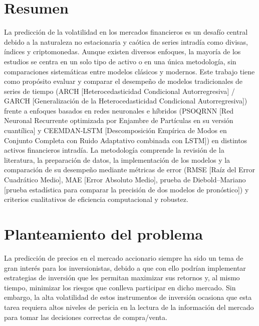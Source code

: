\documentclass[12pt]{paper}
\begin{document}
\section[Resumen]{Resumen}

La predicción de la volatilidad en los mercados financieros es un desafío central debido a la naturaleza no estacionaria y caótica de series intradía como divisas, índices y criptomonedas. Aunque existen diversos enfoques, la mayoría de los estudios se centra en un solo tipo de activo o en una única metodología, sin comparaciones sistemáticas entre modelos clásicos y modernos. Este trabajo tiene como propósito evaluar y comparar el desempeño de modelos tradicionales de series de tiempo (ARCH [Heterocedasticidad Condicional Autorregresiva] / GARCH [Generalización de la Heterocedasticidad Condicional Autorregresiva]) frente a enfoques basados en redes neuronales e híbridos (PSOQRNN [Red Neuronal Recurrente optimizada por Enjambre de Partículas en su versión cuantílica] y CEEMDAN-LSTM [Descomposición Empírica de Modos en Conjunto Completa con Ruido Adaptativo combinada con LSTM]) en distintos activos financieros intradía. La metodología comprende la revisión de la literatura, la preparación de datos, la implementación de los modelos y la comparación de su desempeño mediante métricas de error (RMSE [Raíz del Error Cuadrático Medio], MAE [Error Absoluto Medio], prueba de Diebold–Mariano [prueba estadística para comparar la precisión de dos modelos de pronóstico]) y criterios cualitativos de eficiencia computacional y robustez.

\section[Planteamiento del problema]{Planteamiento del problema}

La predicción de precios en el mercado accionario siempre ha sido un tema de gran interés para los inversionistas, debido a que con ello podrían implementar estrategias de inversión que les permitan maximizar sus retornos y, al mismo tiempo, minimizar los riesgos que conlleva participar en dicho mercado. Sin embargo, la alta volatilidad de estos instrumentos de inversión ocasiona que esta tarea requiera altos niveles de pericia en la lectura de la información del mercado para tomar las decisiones correctas de compra/venta.
\end{document}
